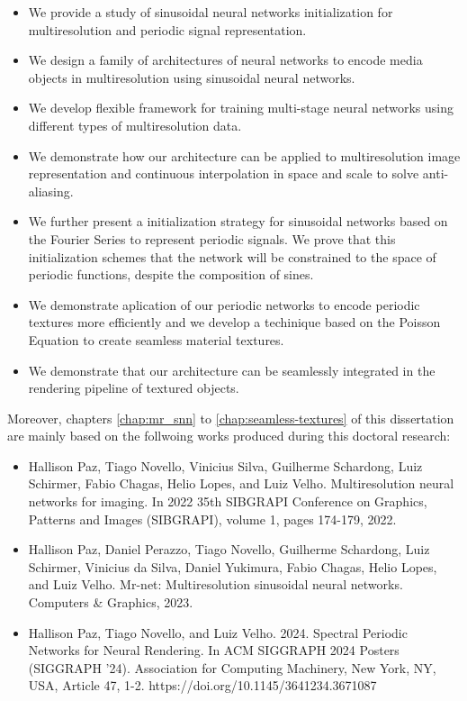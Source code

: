 \begin{itemize}
    \item We provide a study of sinusoidal neural networks initialization for multiresolution and periodic signal representation.
    \item We design a family of architectures of neural networks to encode media objects in multiresolution using sinusoidal neural networks.
    \item We develop flexible framework for training multi-stage neural networks using different types of multiresolution data.
    \item We demonstrate how our architecture can be applied to multiresolution image representation and continuous interpolation in space and scale to solve anti-aliasing.
    \item We further present a initialization strategy for sinusoidal networks based on the Fourier Series to represent periodic signals. We prove that this initialization schemes that the network will be constrained to the space of periodic functions, despite the composition of sines. 
    \item We demonstrate aplication of our periodic networks to encode periodic textures more efficiently and we develop a techinique based on the Poisson Equation to create seamless material textures.
    \item We demonstrate that our architecture can be seamlessly integrated in the  rendering pipeline of textured objects.
\end{itemize}

Moreover, chapters \ref{chap:mr_snn} to \ref{chap:seamless-textures} of this dissertation are mainly based on the follwoing works produced during this doctoral research:

\begin{itemize}
    \item Hallison Paz, Tiago Novello, Vinicius Silva, Guilherme Schardong, Luiz Schirmer, Fabio Chagas, Helio Lopes, and Luiz Velho. Multiresolution neural networks for imaging. In 2022 35th SIBGRAPI Conference on Graphics, Patterns and Images (SIBGRAPI), volume 1, pages 174-179, 2022. 
    \item Hallison Paz, Daniel Perazzo, Tiago Novello, Guilherme Schardong, Luiz Schirmer, Vinicius da Silva, Daniel Yukimura, Fabio Chagas, Helio Lopes, and Luiz Velho. Mr-net: Multiresolution sinusoidal neural networks. Computers \& Graphics, 2023.
    \item Hallison Paz, Tiago Novello, and Luiz Velho. 2024. Spectral Periodic Networks for Neural Rendering. In ACM SIGGRAPH 2024 Posters (SIGGRAPH '24). Association for Computing Machinery, New York, NY, USA, Article 47, 1-2. https://doi.org/10.1145/3641234.3671087
\end{itemize}


